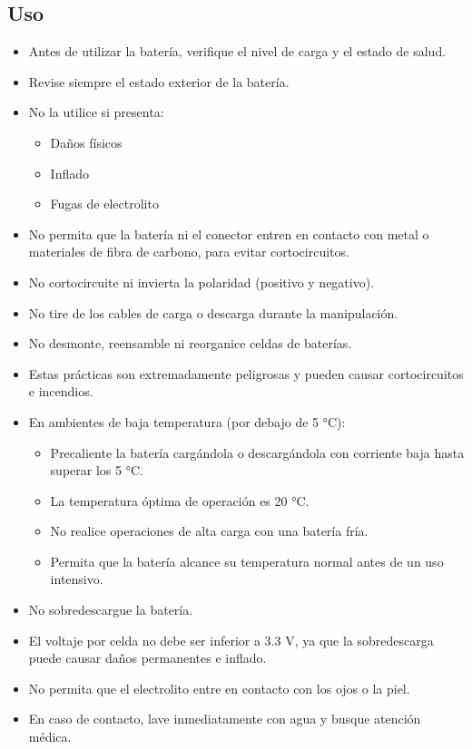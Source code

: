 \documentclass[a4paper,12pt,oneside,pdflatex,italian,final,twocolumn]{article}
\begin{document}
\subsection{Uso}
\begin{itemize}
    \item Antes de utilizar la batería, verifique el nivel de carga y el estado de salud.
    \item Revise siempre el estado exterior de la batería.
    \item No la utilice si presenta:
    \begin{itemize}
        \item Daños físicos
        \item Inflado
        \item Fugas de electrolito
    \end{itemize}
    \item No permita que la batería ni el conector entren en contacto con metal o materiales de fibra de carbono, para evitar cortocircuitos.
    \item No cortocircuite ni invierta la polaridad (positivo y negativo).
    \item No tire de los cables de carga o descarga durante la manipulación.
    \item No desmonte, reensamble ni reorganice celdas de baterías.
    \item Estas prácticas son extremadamente peligrosas y pueden causar cortocircuitos e incendios.
    \item En ambientes de baja temperatura (por debajo de 5 °C):
        \begin{itemize}
        \item Precaliente la batería cargándola o descargándola con corriente baja hasta superar los 5 °C.
        \item La temperatura óptima de operación es 20 °C.
        \item No realice operaciones de alta carga con una batería fría.
        \item Permita que la batería alcance su temperatura normal antes de un uso intensivo.
    \end{itemize}
    \item No sobredescargue la batería.
    \item El voltaje por celda no debe ser inferior a 3.3 V, ya que la sobredescarga puede causar daños permanentes e inflado.
    \item No permita que el electrolito entre en contacto con los ojos o la piel.
    \item En caso de contacto, lave inmediatamente con agua y busque atención médica.
\end{itemize}
\end{document}

